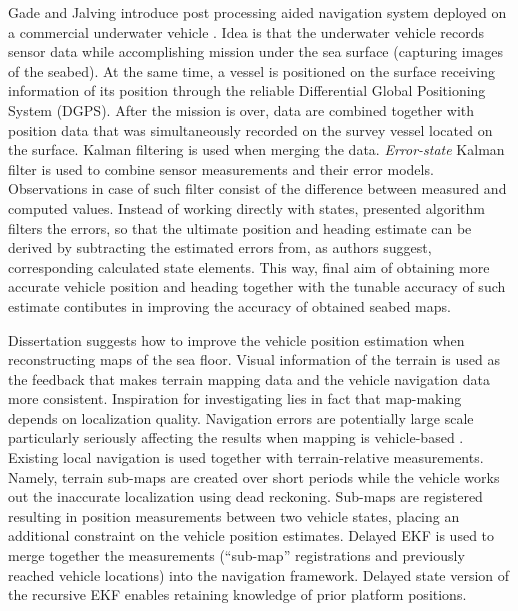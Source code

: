 Gade and Jalving introduce post processing aided navigation system deployed on a commercial underwater vehicle \cite{gade99}. Idea is that the underwater vehicle records sensor data while accomplishing mission under the sea surface (capturing images of the seabed). At the same time, a vessel is positioned on the surface receiving information of its position through the reliable Differential Global Positioning System (DGPS). After the mission is over, data are combined together with position data that was simultaneously recorded on the survey vessel located on the surface. Kalman filtering is used when merging the data. \textit{Error-state} Kalman filter \cite{gade99} is used to combine sensor measurements and their error models. Observations in case of such filter consist of the difference between measured and computed values. Instead of working directly with states, presented algorithm filters the errors, so that the ultimate position and heading estimate can be derived by subtracting the estimated errors from, as authors suggest, corresponding calculated state elements. This way, final aim of obtaining more accurate vehicle position and heading together with the tunable accuracy of such estimate \cite{gade99} contibutes in improving the accuracy of obtained seabed maps. 

Dissertation \cite{roman05} suggests how to improve the vehicle position estimation when reconstructing maps of the sea floor. Visual information of the terrain is used as the feedback that makes terrain mapping data and the vehicle navigation data more consistent. Inspiration for investigating lies in fact that map-making depends on localization quality. Navigation errors are potentially large scale particularly seriously affecting the results when mapping is vehicle-based \cite{roman05}. Existing local navigation is used together with terrain-relative measurements. Namely, terrain sub-maps are created over short periods while the vehicle works out the inaccurate localization using dead reckoning. Sub-maps are registered resulting in position measurements between two vehicle states, placing an additional constraint on the vehicle position estimates. Delayed EKF is used to merge together the measurements (``sub-map'' registrations and previously reached vehicle locations) into the navigation framework. Delayed state version of the recursive EKF enables retaining knowledge of prior platform positions.  

